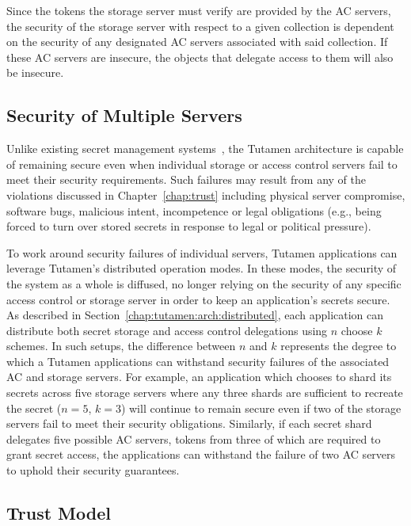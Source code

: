 Since the tokens the storage server must verify are provided by the AC
servers, the security of the storage server with respect to a given
collection is dependent on the security of any designated AC servers
associated with said collection. If these AC servers are insecure, the
objects that delegate access to them will also be insecure.

\subsection{Security of Multiple Servers}

Unlike existing secret management systems~\cite{vault, confidant,
  keywhiz}, the Tutamen architecture is capable of remaining secure
even when individual storage or access control servers fail to meet
their security requirements. Such failures may result from any of the
violations discussed in Chapter~\ref{chap:trust} including physical
server compromise, software bugs, malicious intent, incompetence or
legal obligations (e.g., being forced to turn over stored secrets in
response to legal or political pressure).

To work around security failures of individual servers, Tutamen
applications can leverage Tutamen's distributed operation modes. In
these modes, the security of the system as a whole is diffused, no
longer relying on the security of any specific access control or
storage server in order to keep an application's secrets secure. As
described in Section~\ref{chap:tutamen:arch:distributed}, each
application can distribute both secret storage and access control
delegations using $n$ choose $k$ schemes. In such setups, the
difference between $n$ and $k$ represents the degree to which a
Tutamen applications can withstand security failures of the associated
AC and storage servers. For example, an application which chooses to
shard its secrets across five storage servers where any three shards
are sufficient to recreate the secret ($n=5$, $k=3$) will continue to
remain secure even if two of the storage servers fail to meet their
security obligations. Similarly, if each secret shard delegates five
possible AC servers, tokens from three of which are required to grant
secret access, the applications can withstand the failure of two AC
servers to uphold their security guarantees.

\subsection{Trust Model}


